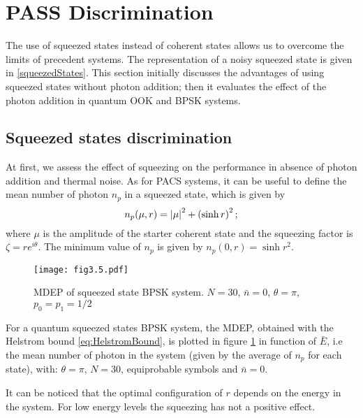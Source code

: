 \section{PASS Discrimination}
    The use of squeezed states instead of coherent states allows us to overcome the limits
    of precedent systems. The representation of a noisy squeezed state is given in 
    \ref{squeezedStates}. This section initially discusses the advantages of using squeezed states 
    without photon addition; then it evaluates the effect of the photon addition
    in quantum OOK and BPSK systems.

    \subsection{Squeezed states discrimination}
        At first, we assess the effect of squeezing on the performance in absence of photon 
        addition and thermal noise. As for PACS systems, it can be useful to define the mean 
        number of photon $n_p$ in a squeezed state, which is given by
        \begin{equation}
            n_p(\mu,r) = \absolutevalue{\mu}^2 + \left(\sinh{r}\right)^2;
        \end{equation}
        where $\mu$ is the amplitude of the starter coherent state and the squeezing factor
        is $\zeta = r e^{i\theta}$. The minimum value of $n_p$ is given by $n_p(0,r) = \sinh{r}^2$.

        \begin{figure}[tbp]
            \begin{center}
                \texttt{[image: fig3.5.pdf]}
                \caption{MDEP of squeezed state BPSK system. 
                    $N=30$, $\bar{n}=0$, $\theta=\pi$, $p_0=p_1=1/2$}
                \label{fig:3.5}
            \end{center}     
        \end{figure}
        For a quantum squeezed states BPSK system, the MDEP, obtained with the Helstrom bound 
        \ref{eq:HelstromBound}, is plotted in figure \ref{fig:3.5} in function of $\bar{E}$,
        i.e the mean number of photon in the system (given by the average of $n_p$ for each state), with:
        $\theta=\pi$, $N=30$, equiprobable symbols and $\bar{n}=0$.

        It can be noticed that the optimal configuration of $r$ depends on the energy in the 
        system. For low energy levels the squeezing has not a positive effect.

